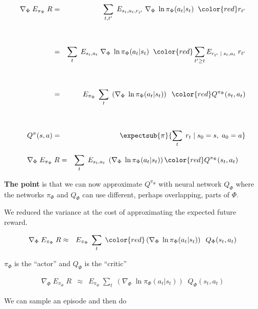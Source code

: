 {\begin{eqnarray*}
    \nabla_\Phi \; E_{\pi_\Phi}\; R  & = & \sum_{t,t'}\;E_{s_t,a_t,r_{t'}}\;\nabla_\Phi\; \ln \pi_\Phi(a_{t}|s_{t})\;\;{\color{red} r_{t'}} \\
    \\
    \\
    & = & \sum_{t}\;E_{s_t,a_t}\;\nabla_\Phi\; \ln \pi_\Phi(a_{t}|s_{t})\;\;{\color{red} \sum_{t' \geq t} E_{r_{t'}\;|\;s_t,a_t}\;r_{t'}} \\
  \\
  \\
  & = & E_{\pi_\Phi} \; \sum_t\; \left(\nabla_\Phi \;\ln \pi_\Phi(a_t|s_t)\right) \;\;{\color{red} Q^{\pi_\Phi}(s_t,a_t)} \\
  \\
  \\
 Q^\pi(s,a) & = & \expectsub{\pi}{\sum_t\; r_t\;|\;s_0=s,\;a_0=a}
 \end{eqnarray*}

\begin{eqnarray*}
  \nabla_\Phi \;E_{\pi_\Phi}\;R   & = & \sum_t\;E_{s_t,a_t}\; \left(\nabla_\Phi \;\ln \pi_\Phi(a_t|s_t)\right) {\color{red} Q^{\pi_\Phi}(s_t,a_t)}
\end{eqnarray*}

\vfill
{\bf The point} is that we can now approximate $Q^{\pi_\Phi}$ with neural network $Q_\Phi$ where the networks $\pi_\Phi$ and $Q_\Phi$ can use different, perhaps overlapping, parts of $\Phi$.

\vfill
We reduced the variance at the cost of approximating the expected future reward.


\begin{eqnarray*}
  \nabla_\Phi \;E_{\pi_\Phi}\;R   & \approx & E_{\pi_\Phi} \; \sum_t\; {\color{red} \left(\nabla_\Phi \;\ln \pi_\Phi(a_t|s_t)\right) \;\;Q_\Phi(s_t,a_t)}
\end{eqnarray*}

\vfill
\centerline{{\color{red} $\pi_\Phi$} is the ``actor'' and {\color{red} $Q_\Phi$} is the ``critic''}

\begin{eqnarray*}
  \nabla_\Phi \;E_{\pi_\Phi}\;R   & \approx & E_{\pi_\Phi} \; \sum_t\; \left(\nabla_\Phi \;\ln \pi_\Phi(a_t|s_t)\right) \;\;Q_\Phi(s_t,a_t)
\end{eqnarray*}

We can sample an episode and then do

}
